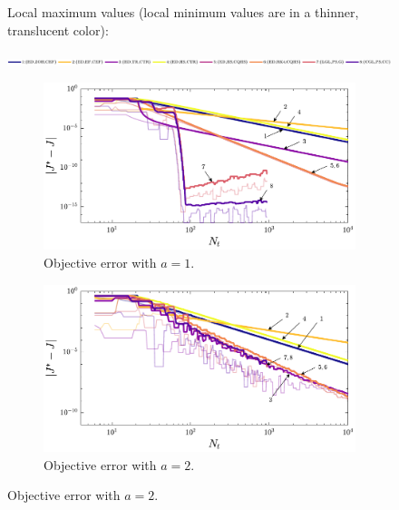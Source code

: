 \begin{figure}%
\centering

{\footnotesize Local maximum values (local minimum values are in a thinner, translucent color):}

\includegraphics[width=\textwidth]{../ch5/figures/ex1_sens_legend}%

\vspace{1mm}

\begin{subfigure}{0.5\textwidth}
\centering
\includegraphics[width=\textwidth]{../ch5/figures/ex3_sens_objective_a1}%
\caption{Objective error with $a=1$.}
\label{fig:ch5:ex3sens:objective:a1}
\end{subfigure}%
\begin{subfigure}{0.5\textwidth}
\centering
\includegraphics[width=\textwidth]{../ch5/figures/ex3_sens_objective_a2}%
\caption{Objective error with $a=2$.}
\label{fig:ch5:ex3sens:objective:a2}
\end{subfigure}%


\end{figure}
